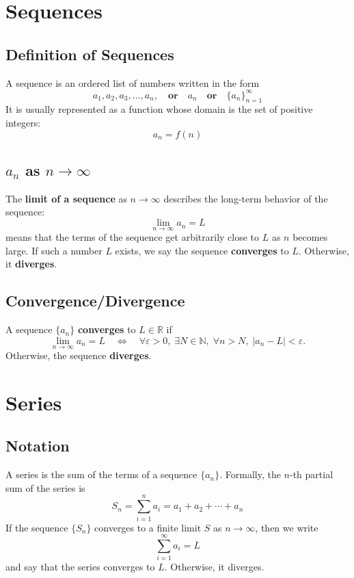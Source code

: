 \documentclass[11pt]{article}
\begin{document}
\pagestyle{plain}
\begin{center}
  \tableofcontents
\end{center}
\newpage
\setcounter{page}{1}
\pagestyle{fancy}

\section{Sequences}
\subsection{Definition of Sequences}
A sequence is an ordered list of numbers written in the form 
\[
  a_1, a_2, a_3, \dots, a_n, \quad\textbf{or}\quad a_n\quad\textbf{or}\quad\{a_n\}_{n=1}^\infty
\]
It is usually represented as a function whose domain is the set of positive integers:
\[
    a_n = f(n)
\]
\subsection{$a_n$ as $n\to\infty$}
The \textbf{limit of a sequence} as $n \to \infty$ describes the long-term behavior of the sequence:
\[
    \lim_{n \to \infty} a_n = L
\]
means that the terms of the sequence get arbitrarily close to $L$ as $n$ becomes large. If such a number $L$ exists, we say the sequence \textbf{converges} to $L$. Otherwise, it \textbf{diverges}.
\subsection{Convergence/Divergence}
A sequence $\{a_n\}$ \textbf{converges} to $L \in \mathbb{R}$ if
\[
  \lim_{n \to \infty} a_n = L \quad \Longleftrightarrow \quad \forall \varepsilon > 0, \; \exists N \in \mathbb{N}, \; \forall n > N, \; |a_n - L| < \varepsilon.
\]
Otherwise, the sequence \textbf{diverges}.
\section{Series}
\subsection{Notation}
A series is the sum of the terms of a sequence $\{a_n\}$.
Formally, the $n$-th partial sum of the series is
\[
    S_n = \sum_{i=1}^n a_i = a_1 + a_2 + \cdots + a_n
\]
If the sequence $\{S_n\}$ converges to a finite limit $S$ as $n \to \infty$, then we write
\[
    \sum_{i=1}^{\infty} a_i = L
\]
and say that the series converges to $L$. Otherwise, it diverges.
\end{document}
